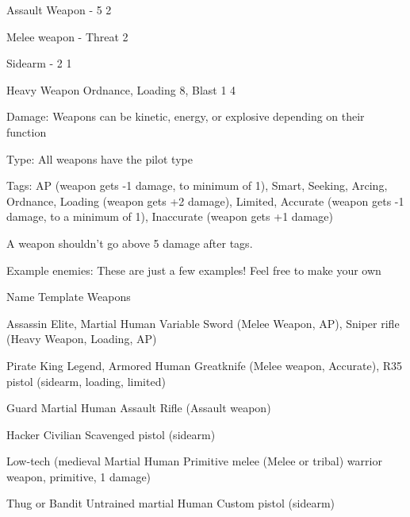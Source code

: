  Assault Weapon               -                            5                        2

 Melee weapon                 -                            Threat                   2




 Sidearm                      -                             2                       1

 Heavy Weapon                 Ordnance, Loading             8, Blast 1              4

Damage: Weapons can be kinetic, energy, or explosive depending on their function

Type: All weapons have the pilot type

Tags: AP (weapon gets -1 damage, to minimum of 1), Smart, Seeking, Arcing, Ordnance,
Loading (weapon gets +2 damage), Limited, Accurate (weapon gets -1 damage, to a minimum of
1), Inaccurate (weapon gets +1 damage)


A weapon shouldn’t go above 5 damage after tags.


                                            Example enemies:
These are just a few examples! Feel free to make your own


 Name                     Template                              Weapons

 Assassin                  Elite, Martial Human                 Variable Sword (Melee
                                                                Weapon, AP), Sniper rifle
                                                                (Heavy Weapon, Loading,
                                                                AP)

 Pirate King               Legend, Armored Human                Greatknife (Melee weapon,
                                                                Accurate), R35 pistol
                                                                (sidearm, loading, limited)

 Guard                     Martial Human                        Assault Rifle (Assault
                                                                weapon)

 Hacker                    Civilian                             Scavenged pistol (sidearm)

 Low-tech (medieval        Martial Human                        Primitive melee (Melee
 or tribal) warrior                                             weapon, primitive, 1
                                                                damage)

 Thug or Bandit            Untrained martial Human              Custom pistol (sidearm)
